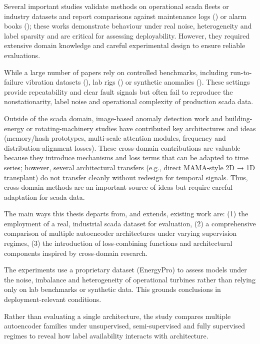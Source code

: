 Several important studies validate methods on operational \gls{scada} fleets or industry datasets and report comparisons against maintenance logs (\cite{bilendo_normal_2022}) or alarm books (\cite{liu_wind_2022}); these works demonstrate behaviour under real noise, heterogeneity and label sparsity and are critical for assessing deployability.
However, they required extensive domain knowledge and careful experimental design to ensure reliable evaluations.

While a large number of papers rely on controlled benchmarks, including run-to-failure vibration datasets (\cite{wen_new_2019}), lab rigs (\cite{ahmad_autoencoder-based_2020}) or synthetic anomalies (\cite{fan_analytical_2018,yao_svd-ae_2024}).
These settings provide repeatability and clear fault signals but often fail to reproduce the nonstationarity, label noise and operational complexity of production \gls{scada} data.

Outside of the \gls{scada} domain, image-based anomaly detection work and building-energy or rotating-machinery studies have contributed key architectures and ideas (memory/hash prototypes, multi-scale attention modules, frequency and distribution-alignment losses). 
These cross-domain contributions are valuable because they introduce mechanisms and loss terms that can be adapted to time series; 
however, several architectural transfers (e.g., direct MAMA-style 2D → 1D transplant) do not transfer cleanly without redesign for temporal signals. 
Thus, cross-domain methods are an important source of ideas but require careful adaptation for \gls{scada} data.

The main ways this thesis departs from, and extends, existing work are:
(1) the employment of a real, industrial \gls{scada} dataset for evaluation,
(2) a comprehensive comparison of multiple autoencoder architectures under varying supervision regimes,
(3) the introduction of loss-combining functions and architectural components inspired by cross-domain research.


The experiments use a proprietary dataset (EnergyPro) to assess models under the noise, imbalance and heterogeneity of operational turbines rather than relying only on lab benchmarks or synthetic data. 
This grounds conclusions in deployment-relevant conditions.

Rather than evaluating a single architecture, the study compares multiple autoencoder families under unsupervised, semi-supervised and fully supervised regimes to reveal how label availability interacts with architecture.

